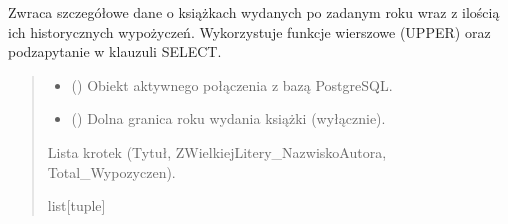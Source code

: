 \documentclass[letterpaper,10pt,english]{sphinxmanual}
\begin{document}
\begin{fulllineitems}
\label{\detokenize{rozdzial_5/index:biblioteka_zapytania.get_ksiazki_z_iloscia_wypozyczen}}
\pysigstartsignatures
\pysiglinewithargsret
{}
{\sphinxparamcomma {}}
{}
\pysigstopsignatures
\sphinxAtStartPar
Zwraca szczegółowe dane o książkach wydanych po zadanym roku wraz z ilością ich historycznych 
wypożyczeń. Wykorzystuje funkcje wierszowe (UPPER) oraz podzapytanie w klauzuli SELECT.
\begin{quote}\begin{description}
\begin{itemize}
\item {} 
\sphinxAtStartPar
{} () \textendash{} Obiekt aktywnego połączenia z bazą PostgreSQL.

\item {} 
\sphinxAtStartPar
{} () \textendash{} Dolna granica roku wydania książki (wyłącznie).

\end{itemize}

\sphinxAtStartPar
Lista krotek (Tytuł, ZWielkiejLitery\_NazwiskoAutora, Total\_Wypozyczen).

\sphinxAtStartPar
list{[}tuple{]}

\end{description}\end{quote}

\end{fulllineitems}

\end{document}
